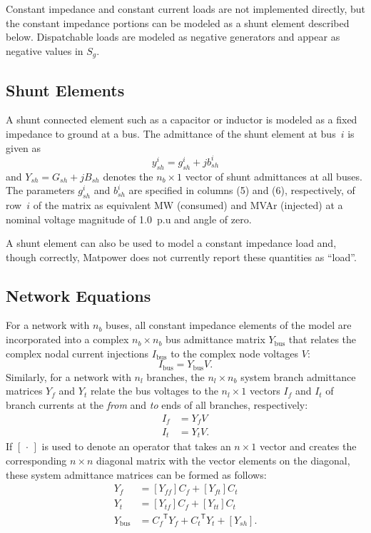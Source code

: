 \documentclass[12pt]{article}
\newcommand{\matpower}[0]{{\sc Matpower}}
\newcommand{\code}[1]{{\relsize{-0.5}{\tt{{#1}}}}}  %
\newcommand{\bus}[0]{\code{bus}}
\newcommand{\trans}[1]{{#1}^{\ensuremath{\mathsf{T}}}}  %
\newcommand{\diag}[1]{\left[{#1}\right]}                %
\numberwithin{equation}{section}
\numberwithin{table}{section}
\numberwithin{figure}{section}
\begin{document}
Constant impedance and constant current loads are not implemented directly, but the constant impedance portions can be modeled as a shunt element described below. Dispatchable loads are modeled as negative generators and appear as negative values in $S_g$.


\subsection{Shunt Elements}

A shunt connected element such as a capacitor or inductor is modeled as a fixed impedance to ground at a bus. The admittance of the shunt element at bus~$i$ is given as
\begin{equation}
y^i_{sh} = g^i_{sh} + j b^i_{sh}
\end{equation}
and $Y_{sh} = G_{sh} + j B_{sh}$ denotes the $n_b \times 1$ vector of shunt admittances at all buses. The parameters $g^i_{sh}$ and $b^i_{sh}$ are specified in columns \code{GS} (5) and \code{BS} (6), respectively, of row~$i$ of the \bus{} matrix as equivalent MW (consumed) and MVAr (injected) at a nominal voltage magnitude of 1.0~p.u and angle of zero.

A shunt element can also be used to model a constant impedance load and, though correctly, \matpower{} does not currently report these quantities as ``load''.


\subsection{Network Equations}

For a network with $n_b$ buses, all constant impedance elements of the model are incorporated into a complex $n_b \times n_b$ bus admittance matrix $Y_\mathrm{bus}$ that relates the complex nodal current injections $I_\mathrm{bus}$ to the complex node voltages $V$:
\begin{equation}
I_\mathrm{bus} = Y_\mathrm{bus} V. \label{eq:Ibus}
\end{equation}
Similarly, for a network with $n_l$ branches, the $n_l \times n_b$ system branch admittance matrices $Y_f$ and $Y_t$ relate the bus voltages to the $n_l \times 1$ vectors $I_f$ and $I_t$ of branch currents at the \emph{from} and \emph{to} ends of all branches, respectively:
\begin{align}
I_f &= Y_f V \label{eq:If} \\
I_t &= Y_t V. \label{eq:It}
\end{align}
If $\diag{\,\cdot\,}$ is used to denote an operator that takes an $n \times 1$ vector and creates the corresponding $n \times n$ diagonal matrix with the vector elements on the diagonal, these system admittance matrices can be formed as follows:
\begin{align}
Y_f &= \diag{ Y_{f\!f} } C_f + \diag{ Y_{ft} } C_t \label{eq:Yf} \\
Y_t &= \diag{ Y_{t\!f} } C_f + \diag{ Y_{tt} } C_t \label{eq:Yt} \\
Y_\mathrm{bus} &= \trans{C_f \!} Y_f + \trans{C_t \!} Y_t + \diag{ Y_{sh} }. \label{eq:Ybus}
\end{align}
\end{document}
